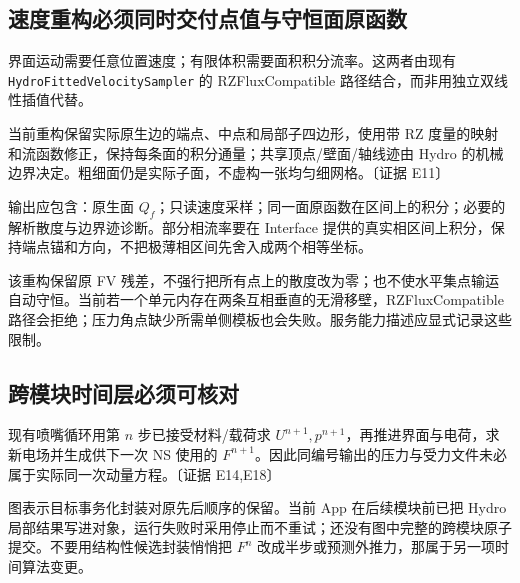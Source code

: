 \documentclass[UTF8,a4paper,11pt,fontset=fandol]{ctexart}
\newcommand{\code}[1]{\nolinkurl{#1}}
\newcommand{\ev}[1]{{\small\color{muted}〔证据 #1〕}}
\begin{document}
\subsection{速度重构必须同时交付点值与守恒面原函数}
界面运动需要任意位置速度；有限体积需要面积积分流率。这两者由现有 \code{HydroFittedVelocitySampler} 的 RZFluxCompatible 路径结合，而非用独立双线性插值代替。

当前重构保留实际原生边的端点、中点和局部子四边形，使用带 RZ 度量的映射和流函数修正，保持每条面的积分通量；共享顶点/壁面/轴线迹由 Hydro 的机械边界决定。粗细面仍是实际子面，不虚构一张均匀细网格。\ev{E11}

输出应包含：原生面 $Q_f$；只读速度采样；同一面原函数在区间上的积分；必要的解析散度与边界迹诊断。部分相流率要在 Interface 提供的真实相区间上积分，保持端点锚和方向，不把极薄相区间先舍入成两个相等坐标。

该重构保留原 FV 残差，不强行把所有点上的散度改为零；也不使水平集点输运自动守恒。当前若一个单元内存在两条互相垂直的无滑移壁，RZFluxCompatible 路径会拒绝；压力角点缺少所需单侧模板也会失败。服务能力描述应显式记录这些限制。

\subsection{跨模块时间层必须可核对}
现有喷嘴循环用第 $n$ 步已接受材料/载荷求 $U^{n+1},p^{n+1}$，再推进界面与电荷，求新电场并生成供下一次 NS 使用的 $F^{n+1}$。因此同编号输出的压力与受力文件未必属于实际同一次动量方程。\ev{E14,E18}

\begin{center}
\end{center}
图表示目标事务化封装对原先后顺序的保留。当前 App 在后续模块前已把 Hydro 局部结果写进对象，运行失败时采用停止而不重试；还没有图中完整的跨模块原子提交。不要用结构性候选封装悄悄把 $F^n$ 改成半步或预测外推力，那属于另一项时间算法变更。
\end{document}
